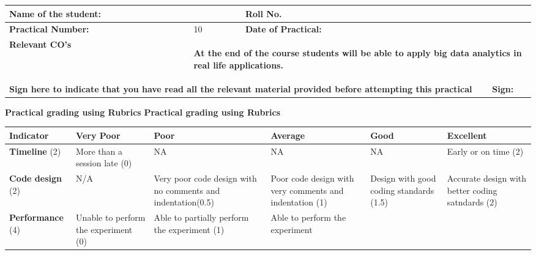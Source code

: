 \documentclass[11pt,article]{memoir}
\begin{document}
\sloppy
\fancypage{\doublebox}{}
\begin{flushleft}


    \begin{tabular}{ | p{4cm} | p{5cm} | p{3.5cm} | p{2cm} |}
    \hline

    \textbf{Name of the student:}& &\textbf{Roll No.} & \\ \hline
    \textbf{Practical Number:}& 10 & \textbf{Date of Practical:} & \\ \hline
	\textbf{Relevant CO's} & \multicolumn{3}{|p{10.5cm}|}{\begin{flushleft}
	\textbf{At the end of the course students will be able to apply big data analytics in real life applications.}
	\end{flushleft}}\\
    \hline
    \multicolumn{3}{|p{12.5cm}|}{\textbf{Sign here to indicate that you have read all the relevant material provided before attempting this practical}}& \textbf{Sign:}\\ \hline
    \end{tabular}
    \vspace{1cm}
        \textbf{Practical grading using Rubrics}
           \textbf{Practical grading using Rubrics}
                             \begin{tabular}{|p{2cm}|p{2cm}|p{2cm}|p{2cm}|p{2cm}|p{2cm}|}
                             \hline \textbf{Indicator} & \textbf{Very Poor} & \textbf{Poor} & \textbf{Average} & \textbf{Good} & \textbf{Excellent} \\ 
                             \hline \textbf{Timeline} (2) & More than a session late (0) & NA  & NA & NA  & Early or on time (2) \\ 
                             \hline \textbf{Code design} (2) & N/A & Very poor code design with no comments and indentation(0.5) & Poor code design with very comments and indentation
                             (1) & Design with good coding standards (1.5) & Accurate design with better coding satndards (2) \\ 
                             \hline \textbf{Performance} (4) & Unable to
                             perform the
                             experiment
                             (0) & Able to
                             partially
                             perform the
                             experiment
                             (1)
                              & Able to
                              perform the
                              experiment

\end{tabular}
\end{flushleft}
\end{document}
